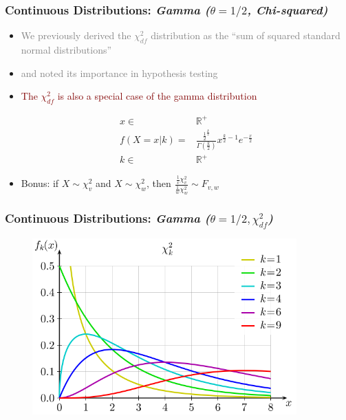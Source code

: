 \documentclass[xcolor={dvipsnames}]{beamer}
\begin{document}
\frame
{
 \frametitle{Continuous Distributions: \emph{Gamma ($\theta = 1/2$, Chi-squared)}} %

\begin{itemize}
\item \textcolor{gray}{We previously derived the $\chi^2_{df}$ distribution as the ``sum of squared standard normal distributions''}
\item \textcolor{gray}{and noted its importance in hypothesis testing}  
\item[] \textcolor{Maroon}{The $\chi^2_{df}$ is also a special case of the gamma distribution}

\LARGE

\vspace{-.75em}

\begin{align*}
x \in {} & \mathbb{R}^+ \\
f(X=x|k) = {} & \frac{\frac{1}{2}^{\frac{k}{2}}}{\Gamma\left(\frac{k}{2}\right)} x^{\frac{k}{2}-1} e^{-\frac{x}{2}}\\
k \in {} & \mathbb{R}^+
\end{align*}

\vspace{.25em}

\normalsize
\item[] \textcolor{NavyBlue}{Bonus: if $X\sim\chi^2_{v}$ and $X\sim\chi^2_{w}$, then 
$\frac{\frac{1}{v}\chi^2_{v}}{\frac{1}{w}\chi^2_{w}} \sim F_{v,w}$}
\end{itemize}

}

\frame
{
 \frametitle{Continuous Distributions: \emph{Gamma ($\theta = 1/2, \chi^2_{df}$)}}
 
\begin{figure}
\centering
\includegraphics[width=4in]{stuff/chi2.png}
\end{figure}
}
\end{document}
